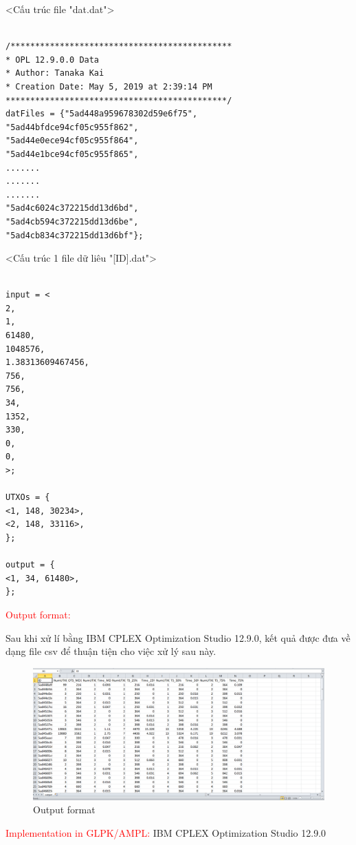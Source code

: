 \documentclass[a4paper]{article}
\begin{document}
<Cấu trúc file "dat.dat">
\begin{lstlisting}[frame=single]

/*********************************************
* OPL 12.9.0.0 Data
* Author: Tanaka Kai
* Creation Date: May 5, 2019 at 2:39:14 PM
*********************************************/
datFiles = {"5ad448a959678302d59e6f75",
"5ad44bfdce94cf05c955f862",
"5ad44e0ece94cf05c955f864",
"5ad44e1bce94cf05c955f865",
.......
.......
.......			
"5ad4c6024c372215dd13d6bd",
"5ad4cb594c372215dd13d6be",
"5ad4cb834c372215dd13d6bf"};

\end{lstlisting}


<Cấu trúc 1 file dữ liêu "[ID].dat">
\begin{lstlisting}[frame=single]

input = <
2, 
1, 
61480, 
1048576, 
1.38313609467456, 
756, 
756, 
34, 
1352, 
330, 
0, 
0, 
>;

UTXOs = { 
<1, 148, 30234>, 
<2, 148, 33116>, 
};

output = { 
<1, 34, 61480>, 
};

\end{lstlisting}

\textcolor{red}{Output format:}

Sau khi xử lí bằng IBM CPLEX Optimization Studio 12.9.0, kết quả được đưa về dạng file csv để thuận tiện cho việc xử lý sau này.

\begin{center}
	\begin{figure} [ht]
		\begin{center}
			\includegraphics[scale=.43]{output}
		\end{center}
		\caption{Output format}
		\label{refhinh1}
	\end{figure}
\end{center}

\textcolor{red}{Implementation in GLPK/AMPL:} IBM CPLEX Optimization Studio 12.9.0
\end{document}
